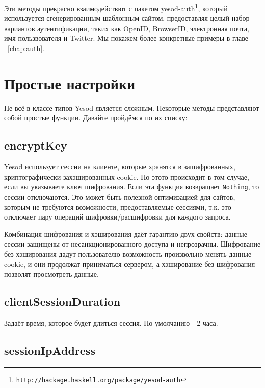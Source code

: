 Эти методы прекрасно взаимодействют с пакетом \href{http://hackage.haskell.org/package/yesod-auth}{yesod-auth}\footnote{\href{http://hackage.haskell.org/package/yesod-auth}{\texttt{http://hackage.haskell.org/package/yesod-auth}}}, который используется сгенерированным шаблонным сайтом, предоставляя целый набор вариантов аутентификации, таких как OpenID, BrowserID, электронная почта, имя пользвователя и Twitter. Мы покажем более конкретные примеры в главе ~\ref{chap:auth}.

\section {Простые настройки}

Не всё в классе типов Yesod является сложным. Некоторые методы представляют собой простые функции. Давайте пройдёмся по их списку:

\subsection {encryptKey}

Yesod использует сессии на клиенте, которые хранятся в зашифрованных, криптографически захэшированных cookie. Но этото происходит в том случае, если вы указываете ключ шифрования. Если эта функция возвращает \lstinline!Nothing!, то сессии отключаются. Это может быть полезной оптимизацией для сайтов, которым не требуются возможности, предоставляемые сессиями, т.к. это отключает пару операций шифровки/расшифровки для каждого запроса.

\begin{remark}
Комбинация шифрования и хэширования даёт гарантию двух свойств: данные сессии защищены от несанкционированного доступа и непрозрачны. Шифрование без хэширования дадут пользователю возможность произвольно менять данные cookie, и они продолжат приниматься сервером, а хэширование без шифрования позволят просмотреть данные.
\end{remark}

\subsection {clientSessionDuration}

Задаёт время, которое будет длиться сессия. По умолчанию - 2 часа.

\subsection {sessionIpAddress}

